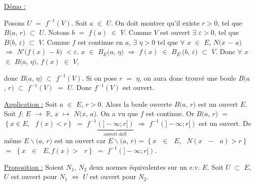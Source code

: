 \documentclass{article}
\begin{document}
\parindent=0cm
\smallbreak
\underline{Démo :} \parindent=1cm \smallbreak
\begin{minipage}{0.6\linewidth}
    Posons $U$ $=$ $f^{-1}(V)$. Soit $a$ $\in$ $U$. On doit montrer qu'il existe $r>0$, tel que $B(a$, $r)$ $\subset$ $U$. Notons $b$ $=$ $f(a)$ $\in$ $V$. Comme $V$ est ouvert \smallbreak $\exists$ $\varepsilon>0$, tel que $B(b$, $\varepsilon)$ $\subset$ $V$. Comme $f$ est continue en $a$, $\exists$ $\eta>0$ tel que $\forall$ $x$ $\in$ $E$, $N(x$ $-$ $a)$ $\Longrightarrow$ $N'(f(x)$ $-$ $b)$ $<\varepsilon$. $x$ $\in$ $B_E(a$, $\eta)$ $\Longrightarrow$ $f(x)$ $\in$ $B_{E'}(b$, $\varepsilon)$ $\subset$ $V$. Donc $\forall$ $x$  $\in$ $B(a$, $\eta)$, $f(x)$ $\in$ $V$, 
\end{minipage}\begin{minipage}{0.4\linewidth}
\end{minipage}
\hspace*{1cm}donc $B(a$, $\eta)$ $\subset$ $f^{-1}(V)$. Si on pose $r$ $=$ $\eta$, on aura donc trouvé une boule $B(a$, $r)$ $\subset$ $f^{-1}(V)$ $=$ $U$. Donc \smallbreak $f^{-1}(V)$ est ouvert.

\parindent=0cm
\smallbreak
\underline{Application :} \parindent=1cm \smallbreak
Soit $a$ $\in$ $E$, $r>0$. Alors la boule ouverte $B(a$, $r)$ est un ouvert $E$. Soit $f$: $E$ $\longrightarrow$ $\mathbb{R}$, $x$ $\mapsto$ $N(x$, $a)$. On a vu \smallbreak que $f$ est continue. Or $B(a$, $r)$ $=$ $\left\{ x \in E,\text{ } f(x) < r \right\}$ $=$ $f^{-1}\underset{\text{ouvert de} \mathbb{R}}{\underbrace{(]-\infty; r[)}}$ $\Longrightarrow$ $f^{-1}(]-\infty; r[)$ est un ouvert.
\smallbreak
De même $E \smallsetminus$\Bbarre$(a$, $r)$ est un ouvert car $E \smallsetminus$\Bbarre$(a$, $r)$ = $\left\{ x \text{ }\in \text{ }E,\text{ }N(x\text{ }-\text{ }a)>r \right\}$ $=$ $\left\{ x \text{ }\in \text{ }E,f(x)>\text{ }r \right\}$ $=$ \smallbreak  $f^{-1}(]-\infty; r[)$.

\parindent=0cm
\smallbreak
\underline{Proposition :} \parindent=1cm \smallbreak
Soient $N_1$, $N_2$ deux normes équivalentes sur un e.v. $E$. Soit $U$ $\subset$ $E$, $U$ est ouvert pour $N_1$ $\Longleftrightarrow$ $U$ est ouvert \smallbreak pour $N_2$.
\end{document}
